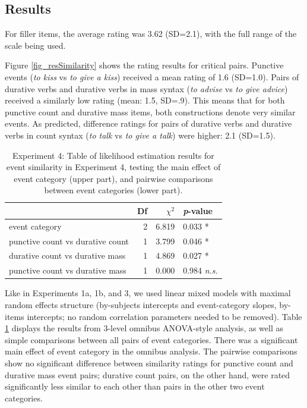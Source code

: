 \documentclass[review,12pt,authoryear]{elsarticle}
\newcommand*{\sectionformat}{\centering}
\begin{document}
\subsection*{\sectionformat Results}\label{sec_resES}
For filler items, the average rating was 3.62 (SD=2.1), with the full range of the scale being used. 

Figure \ref{fig_resSimilarity} shows the rating results for critical pairs. Punctive events (\emph{to kiss} vs \emph{to give a kiss}) received a mean rating of 1.6 (SD=1.0). Pairs of durative verbs and durative verbs in mass syntax (\emph{to advise} vs \emph{to give advice}) received a similarly low rating (mean: 1.5, SD=.9). This means that for both punctive count and durative mass items, both constructions denote very similar events.  As predicted, difference ratings for pairs of durative verbs and durative verbs in count syntax (\emph{to talk} vs \emph{to give a talk}) were higher: 2.1 (SD=1.5).

\begin{table}[ht]
\centering
\begin{tabular}{lrrl}
  \hline
 & Df &  $\chi^2$ & \emph{p}-value \\ 
  \hline
  event category          & 2 &  6.819 &  0.033 * \\    \hline
   punctive count vs durative count    & 1 & 3.799 & 0.046 *   \\    
   durative count vs durative mass    & 1  &  4.869 & 0.027 * \\ 
   punctive count vs durative mass   & 1 &  0.000 &  0.984 \emph{n.s.}\\ \hline
\end{tabular}
\caption{Experiment 4: Table of likelihood estimation results for event similarity in Experiment 4, testing the main effect of event category (upper part), and pairwise comparisons between event categories (lower part).}
\label{tab_SimilarityModels}
\end{table}

Like in Experiments 1a, 1b, and 3, we used linear mixed models with maximal random effects structure (by-subjects intercepts and event-category slopes, by-items intercepts; no random correlation parameters needed to be removed). Table \ref{tab_SimilarityModels} displays the results from 3-level omnibus ANOVA-style analysis, as well as simple comparisons between all pairs of event categories. There was a significant main effect of event category in the omnibus analysis.  The pairwise comparisons show no significant difference between similarity ratings for punctive count and durative mass event pairs; durative count pairs, on the other hand, were rated significantly less similar to each other than pairs in the other two event categories.
\end{document}
